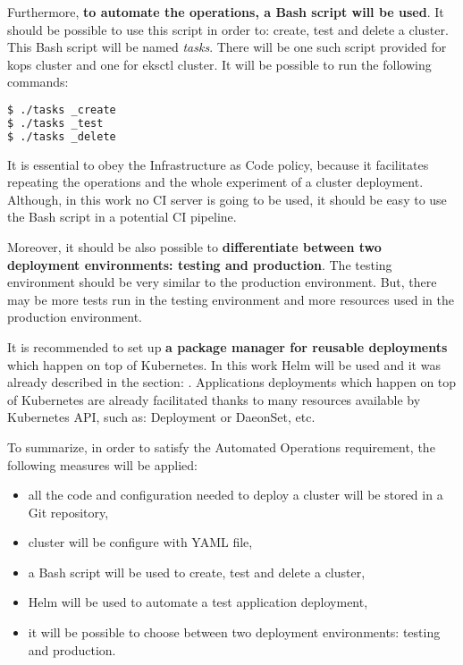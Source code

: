 Furthermore, \textbf{to automate the operations, a Bash script will be used}. It should be possible to use this script in order to: create, test and delete a cluster. This Bash script will be named \textit{tasks}. There will be one such script provided for kops cluster and one for eksctl cluster. It will be possible to run the following commands:
\begin{lstlisting}[basicstyle=\small,caption={Commands provided by tasks file - a Bash script which automates a Kubernetes cluster operations},captionpos=b,language=Bash,xleftmargin=1cm]
$ ./tasks _create
$ ./tasks _test
$ ./tasks _delete
\end{lstlisting}

It is essential to obey the Infrastructure as Code policy, because it facilitates repeating the operations and the whole experiment of a cluster deployment. Although, in this work no CI server is going to be used, it should be easy to use the Bash script in a potential CI pipeline.

Moreover, it should be also possible to \textbf{differentiate between two deployment environments: testing and production}. The testing environment should be very similar to the production environment. But, there may be more tests run in the testing environment and more resources used in the production environment.

It is recommended to set up \textbf{a package manager for reusable deployments} which happen on top of Kubernetes\cite{gruntwork-howto-blog}. In this work Helm will be used and it was already described in the section: . Applications deployments which happen on top of Kubernetes are already facilitated thanks to many resources available by Kubernetes API, such as: Deployment\cite{k8s-resources-depl} or DaeonSet\cite{k8s-resources-ds}, etc.

To summarize, in order to satisfy the Automated Operations requirement, the following measures will be applied:
\begin{itemize}
\item all the code and configuration needed to deploy a cluster will be stored in a Git repository,
\item cluster will be configure with YAML file,
\item a Bash script will be used to create, test and delete a cluster,
\item Helm will be used to automate a test application deployment,
\item it will be possible to choose between two deployment environments: testing and production.
\end{itemize}


